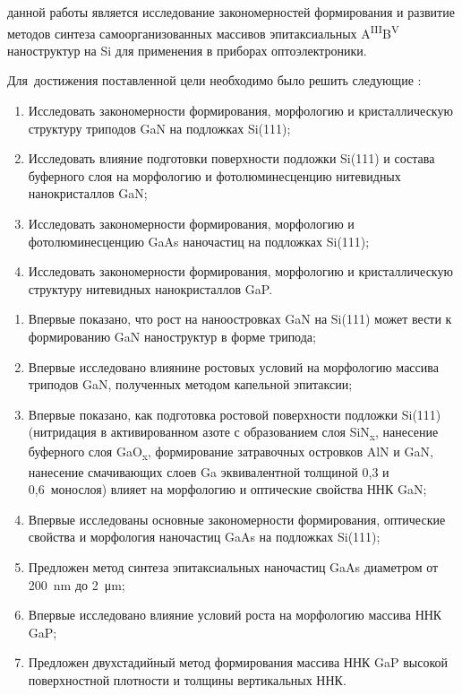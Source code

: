 
{\aim} данной работы является исследование закономерностей формирования и развитие методов синтеза самоорганизованных массивов эпитаксиальных A\textsuperscript{III}B\textsuperscript{V} наноструктур на Si для применения в приборах оптоэлектроники.

Для~достижения поставленной цели необходимо было решить следующие {\tasks}:
\begin{enumerate}[beginpenalty=10000] %
  \item	Исследовать закономерности формирования, морфологию и кристаллическую структуру триподов GaN на подложках Si(111);
  \item	Исследовать влияние подготовки поверхности подложки Si(111) и состава буферного слоя на морфологию и фотолюминесценцию нитевидных нанокристаллов GaN;
  \item Исследовать закономерности формирования, морфологию и фотолюминесценцию GaAs наночастиц на подложках Si(111);
  \item Исследовать закономерности формирования, морфологию и кристаллическую структуру нитевидных нанокристаллов GaP.
\end{enumerate}


{\novelty}
\begin{enumerate}[beginpenalty=10000] %
  \item Впервые показано, что рост на наноостровках GaN на Si(111) может вести к формированию GaN наноструктур в форме трипода;
  \item Впервые исследовано влиянине ростовых условий на морфологию массива триподов GaN, полученных методом капельной эпитаксии;
  \item Впервые показано, как подготовка ростовой поверхности подложки Si(111) (нитридация в активированном азоте с образованием слоя SiN\textsubscript{x}, нанесение буферного слоя GaO\textsubscript{x}, формирование затравочных островков AlN и GaN, нанесение смачивающих слоев Ga эквивалентной толщиной 0,3 и 0,6~монослоя) влияет на морфологию и оптические свойства ННК GaN;
  \item	Впервые исследованы основные закономерности формирования, оптические свойства и морфология наночастиц GaAs на подложках Si(111);
  \item	Предложен метод синтеза эпитаксиальных наночастиц GaAs диаметром от 200~\si{\nano\meter} до 2~\si{\micro\metre};
  \item	Впервые исследовано влияние условий роста на морфологию массива ННК GaP;
  \item Предложен двухстадийный метод формирования массива ННК GaP высокой поверхностной плотности и толщины вертикальных ННК.
\end{enumerate}

